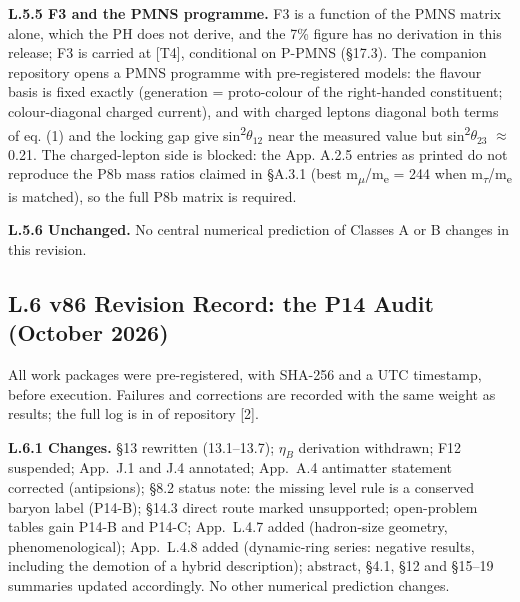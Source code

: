 \documentclass[11pt,letterpaper]{article}
\begin{document}
\noindent \textbf{L.5.5 F3 and the PMNS programme.} F3 is a function of the PMNS matrix alone, which the PH does not derive, and the 7\% figure has no derivation in this release; F3 is carried at [T4], conditional on P-PMNS (§17.3). The companion repository opens a PMNS programme with pre-registered models: the flavour basis is fixed exactly (generation = proto-colour of the right-handed constituent; colour-diagonal charged current), and with charged leptons diagonal both terms of eq. (1) and the locking gap give sin\textsuperscript{2}$\theta_{12}$ near the measured value but sin\textsuperscript{2}$\theta_{23}$ $\approx$ 0.21. The charged-lepton side is blocked: the App. A.2.5 entries as printed do not reproduce the P8b mass ratios claimed in §A.3.1 (best m\textsubscript{$\mu$}/m\textsubscript{e} = 244 when m\textsubscript{$\tau$}/m\textsubscript{e} is matched), so the full P8b matrix is required.

\noindent \textbf{L.5.6 Unchanged.} No central numerical prediction of Classes A or B changes in this revision.

\subsection*{L.6  v86 Revision Record: the P14 Audit (October 2026)}

\noindent All work packages were pre-registered, with SHA-256 and a UTC timestamp, before execution. Failures and corrections are recorded with the same weight as results; the full log is in  of repository [2].

\noindent \textbf{L.6.1 Changes. }§13 rewritten (13.1--13.7); $\eta_B$ derivation withdrawn; F12 suspended; App.~J.1 and J.4 annotated; App.~A.4 antimatter statement corrected (antipsions); §8.2 status note: the missing level rule is a conserved baryon label (P14-B); §14.3 direct route marked unsupported; open-problem tables gain P14-B and P14-C; App.~L.4.7 added (hadron-size geometry, phenomenological); App.~L.4.8 added (dynamic-ring series: negative results, including the demotion of a hybrid description); abstract, §4.1, §12 and §15--19 summaries updated accordingly. No other numerical prediction changes.
\end{document}
